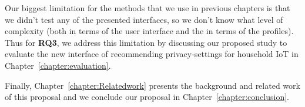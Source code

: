 Our biggest limitation for the methods that we use in previous chapters is that we didn't test any of the presented interfaces, so we don't know what level of complexity (both in terms of the user interface and the in terms of the profiles). Thus for \textbf{RQ3}, we address this limitation by discussing our proposed study to evaluate the new interface of recommending privacy-settings for household IoT in Chapter~\ref{chapter:evaluation}.

Finally, Chapter~\ref{chapter:Relatedwork} presents the background and related work of this proposal and we conclude our proposal in Chapter~\ref{chapter:conclusion}.





